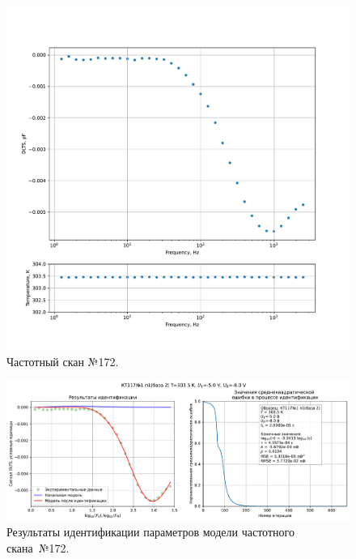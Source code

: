 \begin{figure}[!ht]
    \centering
    \includegraphics[width=1\textwidth]{../plots/КТ117№1_п1(база 2)_2500Гц-1Гц_1пФ_+30С_-5В-8В_100мВ_20мкс_шаг_0,1.pdf}
    \caption{Частотный скан №172.}
    \label{pic:frequency_scan_172}
\end{figure}

\begin{figure}[!ht]
    \centering
    \includegraphics[width=1\textwidth]{../plots/КТ117№1_п1(база 2)_2500Гц-1Гц_1пФ_+30С_-5В-8В_100мВ_20мкс_шаг_0,1_model.pdf}
    \caption{Результаты идентификации параметров модели частотного скана~№172.}
    \label{pic:frequency_scan_model172}
\end{figure}

\pagebreak


